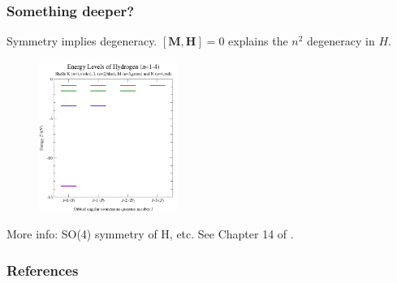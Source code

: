 \documentclass{beamer}
\theoremstyle{definition}
\begin{document}
\begin{frame}
\frametitle{Something deeper?}

Symmetry implies degeneracy. $[\mathbf{M}, \mathbf{H}] = 0 $ explains the $n^2$ degeneracy in $H$. 

\begin{figure}[!htb]
\centering
\includegraphics[width=0.4\textwidth]{figures/Hydrogen_energy_levels.png}
\end{figure}

More info: SO(4) symmetry of H, etc. See Chapter 14 of \cite{gilmore2008lie}. 

\end{frame}





\begin{frame}[allowframebreaks]
	\frametitle{References}
	\fontsize{6pt}{7pt}\selectfont
	
 	
	
\end{frame}
\end{document}
